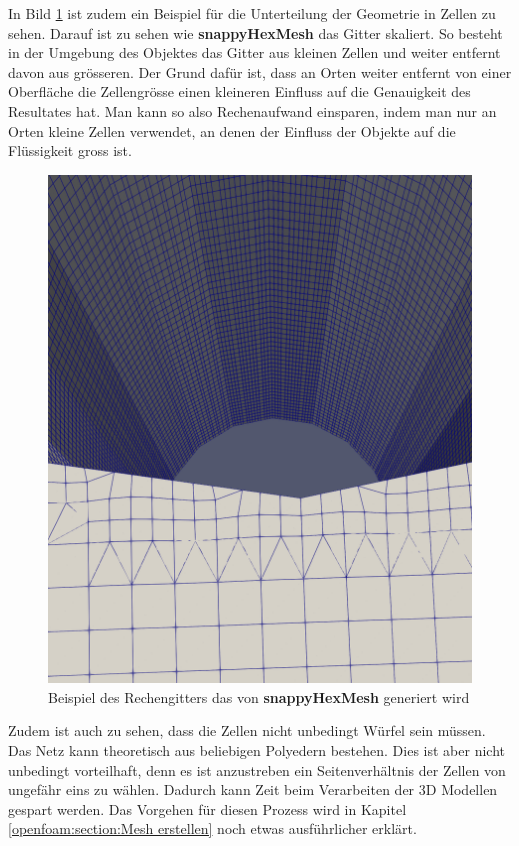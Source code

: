 In Bild \ref{openfoam:fig:sim_grid} ist zudem ein Beispiel für die Unterteilung der Geometrie in Zellen zu sehen.
Darauf ist zu sehen wie \textbf{snappyHexMesh} das Gitter skaliert.
So besteht in der Umgebung des Objektes das Gitter aus kleinen Zellen und weiter entfernt davon aus grösseren.
Der Grund dafür ist, dass an Orten weiter entfernt von einer Oberfläche die Zellengrösse einen kleineren Einfluss auf die Genauigkeit des Resultates hat.
Man kann so also Rechenaufwand einsparen, indem man nur an Orten kleine Zellen verwendet, an denen der Einfluss der Objekte auf die Flüssigkeit gross ist.
\begin{figure}
	\centering
	\includegraphics[scale=0.1]{papers/openfoam/Bilder/grid.png }
	\caption{Beispiel des Rechengitters das von \textbf{snappyHexMesh} generiert wird}
	\label{openfoam:fig:sim_grid}
\end{figure}
Zudem ist auch zu sehen, dass die Zellen nicht unbedingt Würfel sein müssen.
Das Netz kann theoretisch aus beliebigen Polyedern bestehen.
Dies ist aber nicht unbedingt vorteilhaft, denn es ist anzustreben ein Seitenverhältnis der Zellen von ungefähr eins zu wählen. 
Dadurch kann Zeit beim Verarbeiten der 3D Modellen gespart werden.
Das Vorgehen für diesen Prozess wird in Kapitel \ref{openfoam:section:Mesh erstellen} noch etwas ausführlicher erklärt.
